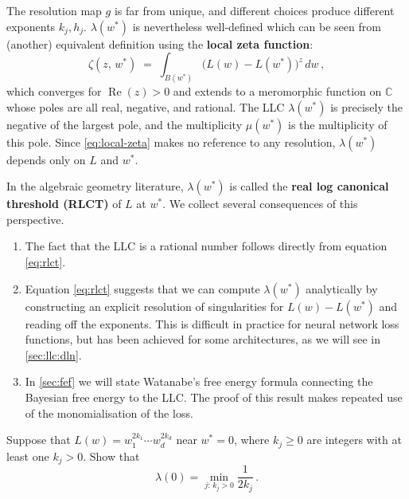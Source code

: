 \documentclass[11pt]{article}
\begin{document}
The resolution map $g$ is far from unique, and different choices
produce different exponents $k_j, h_j$.
$\lambda(w^*)$ is nevertheless well-defined which can be seen from (another) equivalent definition using the \textbf{local zeta function}:
\begin{equation}\label{eq:local-zeta}
    \zeta(z,\, w^*) \;=\; \int_{B(w^*)}
        \bigl(L(w) - L(w^*)\bigr)^{\!z} \, dw\,,
\end{equation}
which converges for $\operatorname{Re}(z) > 0$ and extends to a
meromorphic function on $\mathbb{C}$ whose poles are all real,
negative, and rational.
The LLC $\lambda(w^*)$ is precisely the negative of the largest pole, and
the multiplicity $\mu(w^*)$ is the multiplicity of this pole.
Since \eqref{eq:local-zeta} makes no reference to any resolution,
$\lambda(w^*)$ depends only on $L$ and $w^*$. 

In the algebraic geometry literature, $\lambda(w^*)$ is called the
\textbf{real log canonical threshold (RLCT)} of $L$ at
$w^*$.
We collect several consequences of this perspective.

\begin{enumerate}
    \item The fact that the LLC is a rational number follows directly from equation \eqref{eq:rlct}.
    \item Equation \eqref{eq:rlct} suggests that we can compute 
        $\lambda(w^*)$ analytically by constructing an explicit resolution
        of singularities for $L(w) - L(w^*)$ and reading off the
        exponents.
        This is difficult in practice for neural network loss
        functions, but has been achieved for some architectures, as
        we will see in \cref{sec:llc:dln}.

    \item
        In \cref{sec:fef} we will state Watanabe's free energy formula
        connecting the Bayesian free energy to the LLC\@. The proof of this
        result makes repeated use of the monomialisation of the loss.
\end{enumerate}

\begin{exercise}
\label{ex:rlct-computation}
    Suppose that $L(w) = w_1^{2k_1} \cdots w_d^{2k_d}$ near
    $w^* = 0$, where $k_j \geq 0$ are integers with at least
    one $k_j > 0$. Show that
    \[
        \lambda(0) = \min_{j:\, k_j > 0} \frac{1}{2k_j}\,.
    \]
\end{exercise}
\end{document}
